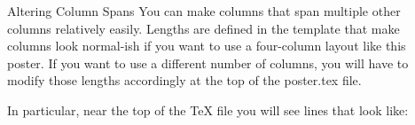 \documentclass[final]{beamer}
\newlength{\sepwid}
\newlength{\onecolwid}
\newlength{\twocolwid}
\newlength{\threecolwid}
\begin{document}
\begin{frame}[t]
\begin{columns}[t]
    \begin{column}{\sepwid}\end{column}			%
    \begin{column}{\threecolwid}					  %
      \begin{block}{Altering Column Spans}
        You can make columns that span multiple other columns relatively easily. Lengths are defined in the template that make columns look normal-ish if you want to use a four-column layout like this poster. If you want to use a different number of columns, you will have to modify those lengths accordingly at the top of the poster.tex file.
        
        In particular, near the top of the TeX file you will see lines that look like:
        

\end{block}
\end{column}
\end{columns}
\end{frame}
\end{document}
